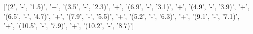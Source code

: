 \documentclass[preview]{standalone}
\begin{document}
\begin{center}
['(2', '-', '1.5)', '+', '(3.5', '-', '2.3)', '+', '(6.9', '-', '3.1)', '+', '(4.9', '-', '3.9)', '+', '(6.5', '-', '4.7)', '+', '(7.9', '-', '5.5)', '+', '(5.2', '-', '6.3)', '+', '(9.1', '-', '7.1)', '+', '(10.5', '-', '7.9)', '+', '(10.2', '-', '8.7)']
\end{center}
\end{document}
